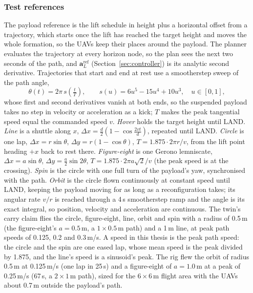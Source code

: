 
\subsubsection{Test references}
\label{sec:trajectories}

The payload reference is the lift schedule in height plus a horizontal offset from a trajectory, which
starts once the lift has reached the target height and moves the whole formation, so the UAVs keep their
places around the payload. The planner evaluates the trajectory at every horizon node, so the plan sees
the next two seconds of the path, and $\mathbf{a}_L^{\mathrm{ref}}$ (Section~\ref{sec:controller}) is its
analytic second derivative. Trajectories that start and end at rest use a smootherstep sweep of the path
angle,
\begin{equation}
    \theta(t) = 2\pi\, s\!\left(\tfrac{t}{T}\right), \qquad s(u) = 6u^5 - 15u^4 + 10u^3, \quad u \in [0,1],
\end{equation}
whose first and second derivatives vanish at both ends, so the suspended payload takes no step in
velocity or acceleration as a kick; $T$ makes the peak tangential speed equal the commanded speed $v$.
\emph{Hover} holds the target height until LAND. \emph{Line} is a shuttle along $x$,
$\Delta x = \tfrac{d}{2}\left(1 - \cos\tfrac{2vt}{d}\right)$, repeated until LAND. \emph{Circle} is one lap,
$\Delta x = r\sin\theta$, $\Delta y = r(1-\cos\theta)$, $T = 1.875 \cdot 2\pi r / v$, from the lift point
heading $+x$ back to rest there. \emph{Figure-eight} is one Gerono lemniscate, $\Delta x = a\sin\theta$,
$\Delta y = \tfrac{a}{2}\sin 2\theta$, $T = 1.875 \cdot 2\pi a\sqrt{2} / v$ (the peak speed is at the
crossing). \emph{Spin} is the circle with one full turn of the payload's yaw, synchronised with the path.
\emph{Orbit} is the circle flown continuously at constant speed until LAND, keeping the payload moving for
as long as a reconfiguration takes; its angular rate $v/r$ is reached through a 4\,s smootherstep ramp and
the angle is its exact integral, so position, velocity and acceleration are continuous. The twin's carry
claim flies the circle, figure-eight, line, orbit and spin with a radius of 0.5\,m (the figure-eight's $a = 0.5$\,m,
a $1 \times 0.5$\,m path) and a 1\,m line, at peak path speeds of 0.125, 0.2 and 0.3\,m/s. A speed in this thesis
is the peak path speed: the circle and the spin are one eased lap, whose mean speed is the peak divided by 1.875,
and the line's speed is a sinusoid's peak. The rig flew the orbit of radius 0.5\,m at 0.125\,m/s (one lap in
25\,s) and a figure-eight of $a = 1.0$\,m at a peak of 0.25\,m/s (67\,s, a $2 \times 1$\,m path), sized for the
6\,$\times$\,6\,m flight area with the UAVs about 0.7\,m outside the payload's path.
